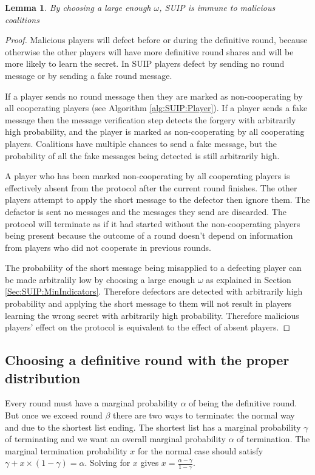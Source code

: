 \documentclass{dalcsthesis}
\newtheorem{lemma}{Lemma}
\begin{document}
\begin{lemma} By choosing a large enough $\omega$, SUIP is immune to malicious coalitions \label{Lem:SUIP:MaliciousImmune} \end{lemma}
\begin{proof}
Malicious players will defect before or during the definitive round, because otherwise the other players will have more definitive round shares and will be more likely to learn the secret. In SUIP players defect by sending no round message or by sending a fake round message.

If a player sends no round message then they are marked as non-cooperating by all cooperating players (see Algorithm \ref{alg:SUIP:Player}). If a player sends a fake message then the message verification step detects the forgery with arbitrarily high probability, and the player is marked as non-cooperating by all cooperating players. Coalitions have multiple chances to send a fake message, but the probability of all the fake messages being detected is still arbitrarily high.

A player who has been marked non-cooperating by all cooperating players is effectively absent from the protocol after the current round finishes. The other players attempt to apply the short message to the defector then ignore them. The defactor is sent no messages and the messages they send are discarded. The protocol will terminate as if it had started without the non-cooperating players being present because the outcome of a round doesn't depend on information from players who did not cooperate in previous rounds.

The probability of the short message being misapplied to a defecting player can be made arbitralily low by choosing a large enough $\omega$ as explained in Section \ref{Sec:SUIP:MinIndicators}. Therefore defectors are detected with arbitrarily high probability and applying the short message to them will not result in players learning the wrong secret with arbitrarily high probability. Therefore malicious players' effect on the protocol is equivalent to the effect of absent players.
\end{proof}

\subsection{Choosing a definitive round with the proper distribution}
\label{Sec:SUIP:ChooseRound}

Every round must have a marginal probability $\alpha$ of being the definitive round. But once we exceed round $\beta$ there are two ways to terminate: the normal way and due to the shortest list ending. The shortest list has a marginal probability $\gamma$ of terminating and we want an overall marginal probability $\alpha$ of termination. The marginal termination probability $x$ for the normal case should satisfy $\gamma + x \times (1 - \gamma) = \alpha$. Solving for $x$ gives $x = \frac{\alpha - \gamma}{1 - \gamma}$.
\end{document}
